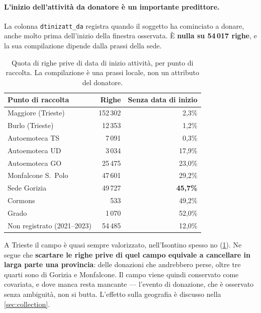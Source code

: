 \paragraph{L'inizio dell'attività da donatore è un importante predittore.}
La colonna \texttt{dtinizatt\_da} registra quando il soggetto ha cominciato a
donare, anche molto prima dell'inizio della finestra osservata. È \textbf{nulla
su 54\,017 righe}, e la sua compilazione dipende dalla prassi
della sede.

\begin{table}[ht]
\centering
\caption{Quota di righe prive di data di inizio attività, per punto di
raccolta. La compilazione è una prassi locale, non un attributo del donatore.}
\label{tab:nulli_sede}
\begin{tabular}{@{}lrr@{}}
\toprule
\textbf{Punto di raccolta} & \textbf{Righe} & \textbf{Senza data di inizio} \\
\midrule
Maggiore (Trieste)  & 152\,302 & \phantom{0}2{,}3\% \\
Burlo (Trieste)     & \phantom{0}12\,353 & \phantom{0}1{,}2\% \\
Autoemoteca TS      & \phantom{00}7\,091 & \phantom{0}0{,}3\% \\
Autoemoteca UD      & \phantom{00}3\,034 & 17{,}9\% \\
Autoemoteca GO      & \phantom{0}25\,475 & 23{,}0\% \\
Monfalcone S.\ Polo & \phantom{0}47\,601 & 29{,}2\% \\
Sede Gorizia        & \phantom{0}49\,727 & \textbf{45{,}7\%} \\
Cormons             & \phantom{000}533 & 49{,}2\% \\
Grado               & \phantom{00}1\,070 & 52{,}0\% \\
\midrule
Non registrato (2021--2023) & \phantom{0}54\,485 & 12{,}0\% \\
\bottomrule
\end{tabular}
\end{table}

A Trieste il campo è quasi sempre valorizzato, nell'Isontino spesso no
(\cref{tab:nulli_sede}). Ne segue che \textbf{scartare le righe prive di quel
campo equivale a cancellare in larga parte una provincia}: delle donazioni che
andrebbero perse, oltre tre quarti sono di Gorizia e Monfalcone. Il campo viene
quindi conservato come covariata, e dove manca resta mancante --- l'evento di
donazione, che è osservato senza ambiguità, non si butta. L'effetto sulla
geografia è discusso nella \cref{sec:collection}.

